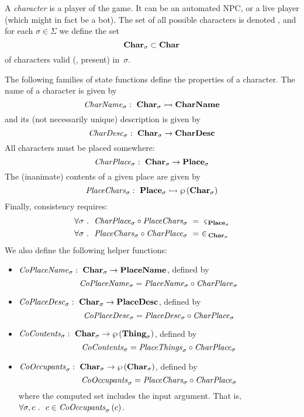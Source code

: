 A {\em character} is a player of the game. It can be an automated NPC,
or a live player (which might in fact be a bot).
The set of all possible characters is denoted \charset{},
and for each $\sigma \in \Sigma$ we define the set
\[ \textbf{Char}_{\sigma} \subset \textbf{Char}_{} \]
of characters valid (\ie, present) in~$\sigma$.

The following families of
state functions define the properties of a character.
The name of a character is given by
\[ \mathit{CharName}_{\sigma}:~ \textbf{Char}_{\sigma} \rightarrowtail \textbf{CharName} \]
and its (not necessarily unique) description is given by
\[ \mathit{CharDesc}_{\sigma}:~ \textbf{Char}_{\sigma} \rightarrow \textbf{CharDesc} \]
All characters must be placed somewhere:
\[ \mathit{CharPlace}_{\sigma}:~ \textbf{Char}_{\sigma} \rightarrow \textbf{Place}_{\sigma} \]
The (inanimate) contents of a given place are given by
\[ \mathit{PlaceChars}_{\sigma}:~ \textbf{Place}_{\sigma} \rightarrowtail
\wp\left(\textbf{Char}_{\sigma}\right) \]
Finally, consistency requires:
\begin{align*}
  \forall \sigma &~.~~
  \mathit{CharPlace}_{\sigma} \circ \mathit{PlaceChars}_{\sigma} ~=~ \mathit{\varsigma_{\,\textbf{Place}_{\sigma}}} \\
  \forall \sigma &~.~~
  \mathit{PlaceChars}_{\sigma} \circ \mathit{CharPlace}_{\sigma} ~=~ \in_{\,\textbf{Char}_{\sigma}}
\end{align*}
We also define the following helper functions:
\begin{itemize}
\item
$\mathit{CoPlaceName}_{\sigma}:~ \textbf{Char}_{\sigma} \rightarrow \textbf{PlaceName}$,
defined by \[\mathit{CoPlaceName}_{\sigma}
= \mathit{PlaceName}_{\sigma} \circ \mathit{CharPlace}_{\sigma} \]
\item
$\mathit{CoPlaceDesc}_{\sigma}:~ \textbf{Char}_{\sigma} \rightarrow \textbf{PlaceDesc}$,
defined by \[\mathit{CoPlaceDesc}_{\sigma}
= \mathit{PlaceDesc}_{\sigma} \circ \mathit{CharPlace}_{\sigma} \]
\item $\mathit{CoContents}_{\sigma}:~ \textbf{Char}_{\sigma} \rightarrow
  \wp\left(\textbf{Thing}_{\sigma}\right)$, defined by
  \[\mathit{CoContents}_{\sigma} = \mathit{PlaceThings}_{\sigma} \circ \mathit{CharPlace}_{\sigma}\]
\item $\mathit{CoOccupants}_{\sigma}:~ \textbf{Char}_{\sigma} \rightarrow
  \wp\left(\textbf{Char}_{\sigma}\right)$, defined by
  \[\mathit{CoOccupants}_{\sigma} = \mathit{PlaceChars}_{\sigma} \circ \mathit{CharPlace}_{\sigma}\]
where the computed set includes the input argument. That is, $\forall
  \sigma, c ~.~~c \in \mathit{CoOccupants}_{\sigma}\left(c\right)$.
\end{itemize}

